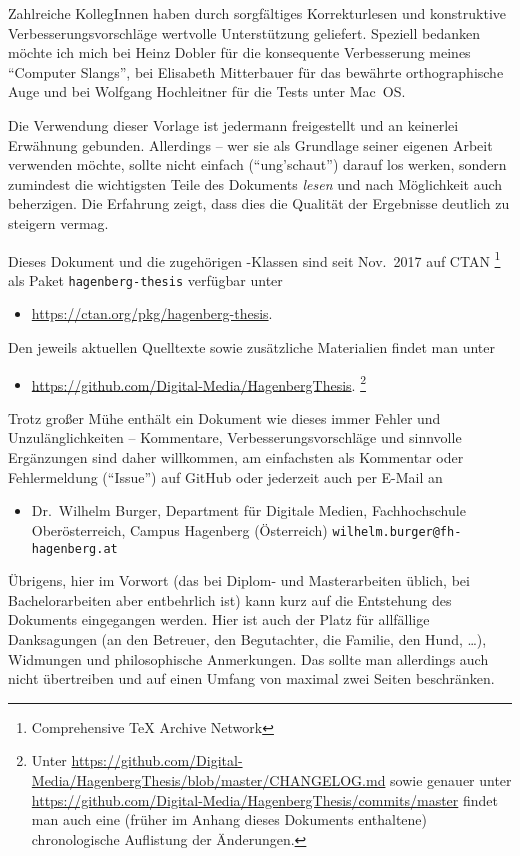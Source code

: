 Zahlreiche KollegInnen haben durch sorgfältiges Korrekturlesen und
konstruktive Verbesserungsvorschläge wertvolle Unterstützung
geliefert. Speziell bedanken möchte ich mich bei Heinz Dobler für
die konsequente Verbesserung meines "`Computer Slangs"', bei
Elisabeth Mitterbauer für das bewährte orthographische Auge und
bei Wolfgang Hochleitner für die Tests unter Mac~OS.

Die Verwendung dieser Vorlage ist jedermann freigestellt und an
keinerlei Erwähnung gebunden. Allerdings -- wer sie als Grundlage
seiner eigenen Arbeit verwenden möchte, sollte nicht einfach
("`ung'schaut"') darauf los werken, sondern zumindest die
wichtigsten Teile des Dokuments \emph{lesen} und nach Möglichkeit
auch beherzigen. Die Erfahrung zeigt, dass dies die Qualität der
Ergebnisse deutlich zu steigern vermag.

Dieses Dokument und die zugehörigen \latex-Klassen sind seit Nov.\ 2017 auf CTAN%
\footnote{Comprehensive TeX Archive Network} 
als Paket \texttt{hagenberg-thesis} verfügbar unter
%
\begin{itemize}
\item[]\url{https://ctan.org/pkg/hagenberg-thesis}.
\end{itemize}
%
Den jeweils aktuellen Quelltexte sowie zusätzliche Materialien findet man unter
%
\begin{itemize}
\item[]\url{https://github.com/Digital-Media/HagenbergThesis}.%
\footnote{Unter \url{https://github.com/Digital-Media/HagenbergThesis/blob/master/CHANGELOG.md}
sowie genauer unter \url{https://github.com/Digital-Media/HagenbergThesis/commits/master} 
findet man auch eine (früher im Anhang dieses Dokuments enthaltene) chronologische Auflistung der 
Änderungen.}
\end{itemize}



\noindent
Trotz großer Mühe enthält ein Dokument wie dieses immer Fehler und Unzulänglichkeiten
-- Kommentare, Verbesserungsvorschläge und sinnvolle Ergänzungen
sind daher willkommen, am einfachsten als Kommentar oder Fehlermeldung ("`Issue"') 
auf GitHub oder jederzeit auch per E-Mail an
%
\begin{itemize}
\item[]
Dr.\ Wilhelm Burger, Department für Digitale Medien,\newline
Fachhochschule Oberösterreich, Campus Hagenberg (Österreich)\newline
\nolinkurl{wilhelm.burger@fh-hagenberg.at}
\end{itemize}

\noindent
Übrigens, hier im Vorwort (das bei Diplom- und Masterarbeiten üblich, bei Bachelorarbeiten 
aber entbehrlich ist) kann kurz auf die Entstehung des Dokuments eingegangen werden.
Hier ist auch der Platz für allfällige Danksagungen (\zB an den Betreuer, 
den Begutachter, die Familie, den Hund, \ldots), Widmungen und philosophische 
Anmerkungen. Das sollte man allerdings auch nicht übertreiben und auf 
einen Umfang von maximal zwei Seiten beschränken.




